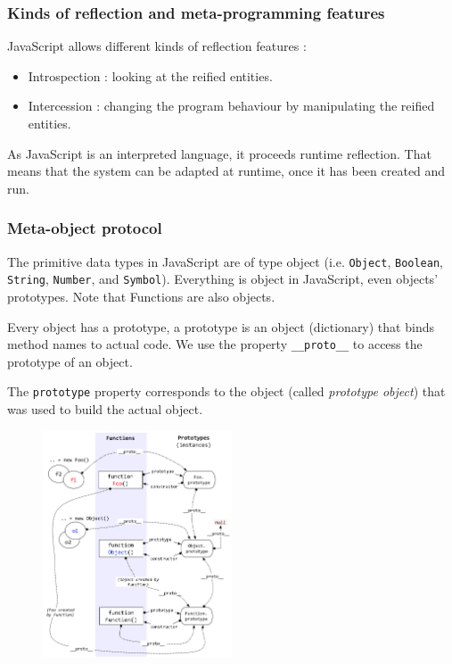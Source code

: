\documentclass[a4paper,10pt]{article}
\begin{document}
\subsubsection{Kinds of reflection and meta-programming features}

JavaScript allows different kinds of reflection features :
\begin{itemize}
    \item Introspection : looking at the reified entities.
    \item Intercession : changing the program behaviour by manipulating the reified entities.
\end{itemize}

As JavaScript is an interpreted language, it proceeds runtime reflection.
That means that the system can be adapted at runtime, once it has been created and run.



\subsubsection{Meta-object protocol}

The primitive data types in JavaScript are of type object (i.e. \lstinline|Object|, \mbox{\lstinline|Boolean|,} \lstinline|String|, \lstinline|Number|, and \lstinline|Symbol|).
Everything is object in JavaScript, even objects’ prototypes.
Note that Functions are also objects.

Every object has a prototype, a prototype is an object (dictionary) that binds method names to actual code.
We use the property \lstinline|__proto__| to access the prototype of an object.

The \lstinline|prototype| property corresponds to the object (called \textit{prototype object}) that was used to build the actual object.

\begin{figure}[h]
    \centering
    \includegraphics[width=0.5\textwidth]{jstypes.png}
\end{figure}
\end{document}
